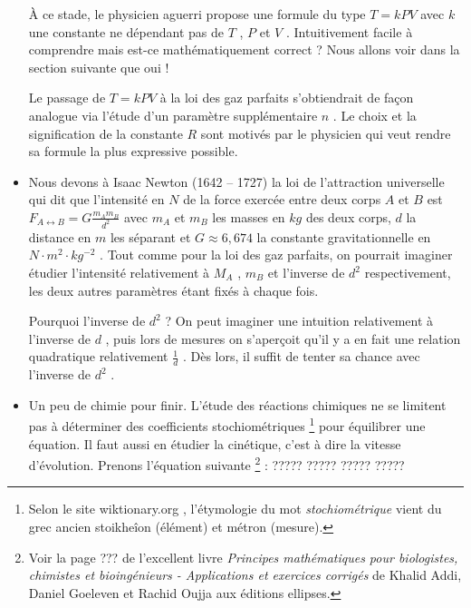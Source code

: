 \begin{itemize}[label=\small\textbullet]
	\noindent
	À ce stade, le physicien aguerri propose une formule du type $T = k P V$ avec $k$ une constante ne dépendant pas de $T$ , $P$ et $V$ .
	Intuitivement facile à comprendre mais est-ce mathématiquement correct ? Nous allons voir dans la section suivante que oui !
	
	\smallskip
	\noindent
	Le passage de $T = k P V$ à la loi des gaz parfaits s'obtiendrait de façon analogue via l'étude d'un paramètre supplémentaire $n$ .
	Le choix et la signification de la constante $R$ sont motivés par le physicien qui veut rendre sa formule la plus expressive possible.




	\medskip
	\item Nous devons à Isaac Newton (1642 -- 1727) la loi de l'attraction universelle qui dit que l'intensité en $N$ de la force exercée entre deux corps $A$ et $B$ est $F_{A \leftrightarrow B} = G \frac{m_A m_B}{d^2}$ avec $m_A$ et $m_B$ les masses en $kg$ des deux corps, $d$ la distance en $m$ les séparant et $G \approx 6,674$ la constante gravitationnelle en $N \cdot m^2 \cdot kg^{-2}$ .
	Tout comme pour la loi des gaz parfaits, on pourrait imaginer étudier l'intensité relativement à $M_A$ , $m_B$ et l'inverse de $d^2$ respectivement, les deux autres paramètres étant fixés à chaque fois.
	
	\smallskip
	\noindent
	Pourquoi l'inverse de $d^2$ ? On peut imaginer une intuition relativement à l'inverse de $d$ , puis lors de mesures on s'aperçoit qu'il y a en fait une relation quadratique relativement $\frac{1}{d}$ . Dès lors, il suffit de tenter sa chance avec l'inverse de $d^2$ .




	\medskip
	\item Un peu de chimie pour finir. L'étude des réactions chimiques ne se limitent pas à déterminer des coefficients stochiométriques
	\footnote{
		Selon le site wiktionary.org , l'étymologie du mot \emph{\og stochiométrique \fg} vient du grec ancien stoikheîon (élément) et métron (mesure).
	}
	pour équilibrer une équation. 	Il faut aussi en étudier la cinétique, c'est à dire la vitesse d'évolution.
	Prenons l'équation suivante
	\footnote{
		Voir la page ??? de l'excellent livre \emph{\og Principes mathématiques pour biologistes, chimistes et bioingénieurs - Applications et exercices corrigés \fg} de Khalid  Addi, Daniel Goeleven et Rachid Oujja aux éditions ellipses.
	} :
	?????
	?????
	?????
	?????
\end{itemize}


